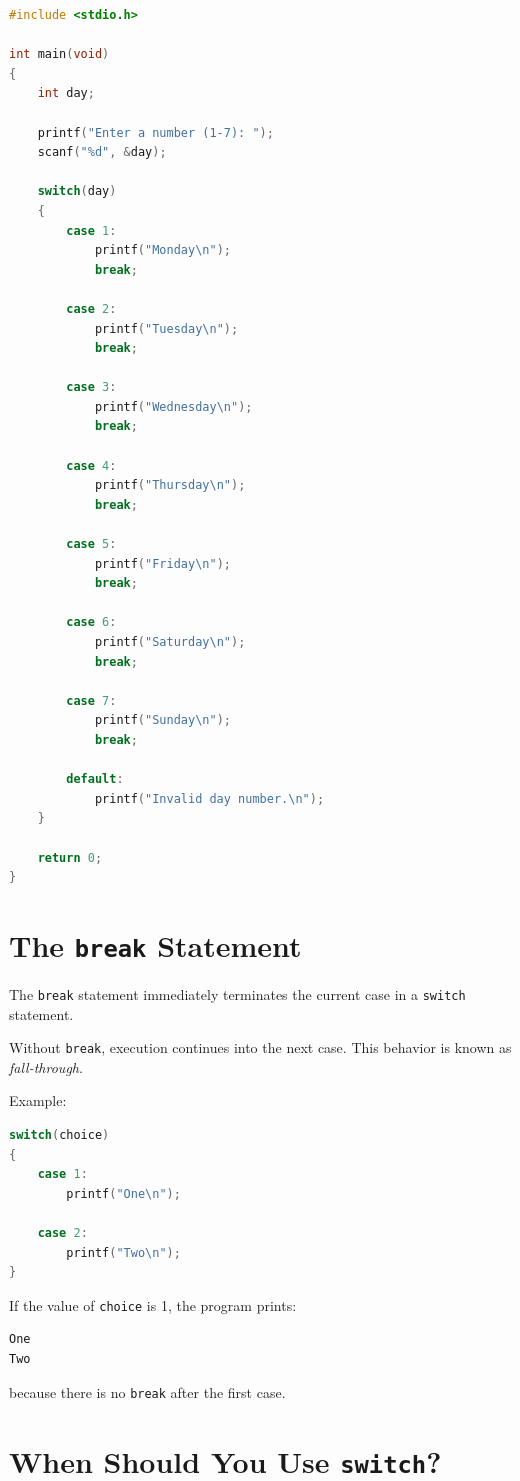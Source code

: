 \documentclass[12pt,openany]{book}
\begin{document}
\begin{lstlisting}[language=C]
#include <stdio.h>

int main(void)
{
    int day;

    printf("Enter a number (1-7): ");
    scanf("%d", &day);

    switch(day)
    {
        case 1:
            printf("Monday\n");
            break;

        case 2:
            printf("Tuesday\n");
            break;

        case 3:
            printf("Wednesday\n");
            break;

        case 4:
            printf("Thursday\n");
            break;

        case 5:
            printf("Friday\n");
            break;

        case 6:
            printf("Saturday\n");
            break;

        case 7:
            printf("Sunday\n");
            break;

        default:
            printf("Invalid day number.\n");
    }

    return 0;
}
\end{lstlisting}

\section{The \texttt{break} Statement}

The \texttt{break} statement immediately terminates the current case in a \texttt{switch} statement.

Without \texttt{break}, execution continues into the next case. This behavior is known as \textit{fall-through}.

Example:

\begin{lstlisting}[language=C]
switch(choice)
{
    case 1:
        printf("One\n");

    case 2:
        printf("Two\n");
}
\end{lstlisting}

If the value of \texttt{choice} is 1, the program prints:

\begin{lstlisting}
One
Two
\end{lstlisting}

because there is no \texttt{break} after the first case.

\section{When Should You Use \texttt{switch}?}
\end{document}
